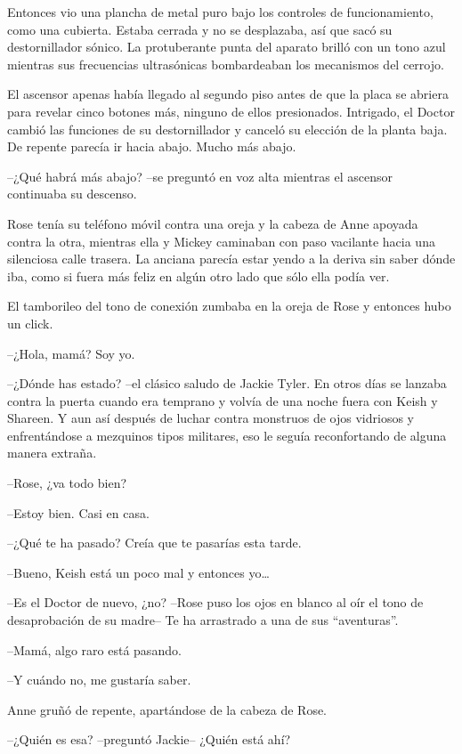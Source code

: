 {Entonces vio una plancha de metal puro bajo los controles de
 funcionamiento, como una cubierta. Estaba cerrada y no se desplazaba,
 así que sacó su destornillador sónico. La protuberante punta del aparato
 brilló con un tono azul mientras sus frecuencias ultrasónicas
bombardeaban los mecanismos del cerrojo.}

{El ascensor apenas había llegado al segundo piso antes de que la placa
 se abriera para revelar cinco botones más, ninguno de ellos presionados.
 Intrigado, el Doctor cambió las funciones de su destornillador y canceló
 su elección de la planta baja. De repente parecía ir hacia abajo. Mucho
más abajo.}

{--¿Qué habrá más abajo? --se preguntó en voz alta mientras el ascensor
continuaba su descenso.}

\mbox{}

{Rose tenía su teléfono móvil contra una oreja y la cabeza de Anne
 apoyada contra la otra, mientras ella y Mickey caminaban con paso
 vacilante hacia una silenciosa calle trasera. La anciana parecía estar
 yendo a la deriva sin saber dónde iba, como si fuera más feliz en algún
otro lado que sólo ella podía ver.}

{El tamborileo del tono de conexión zumbaba en la oreja de Rose y
entonces hubo un click.}

{--¿Hola, mamá? Soy yo.}

{--¿Dónde has estado? --el clásico saludo de Jackie Tyler. En otros días
 se lanzaba contra la puerta cuando era temprano y volvía de una noche
 fuera con Keish y Shareen. Y aun así después de luchar contra monstruos
 de ojos vidriosos y enfrentándose a mezquinos tipos militares, eso le
seguía reconfortando de alguna manera extraña.}

{--Rose, ¿va todo bien?}

{--Estoy bien. Casi en casa.}

{--¿Qué te ha pasado? Creía que te pasarías esta tarde.}

{--Bueno, Keish está un poco mal y entonces yo\ldots{}}

{--Es el Doctor de nuevo, ¿no? --Rose puso los ojos en blanco al oír el
 tono de desaprobación de su madre-- Te ha arrastrado a una de sus
``aventuras''.}

{--Mamá, algo raro está pasando.}

{--Y cuándo no, me gustaría saber.}

{Anne gruñó de repente, apartándose de la cabeza de Rose.}

{--¿Quién es esa? --preguntó Jackie-- ¿Quién está ahí?}


